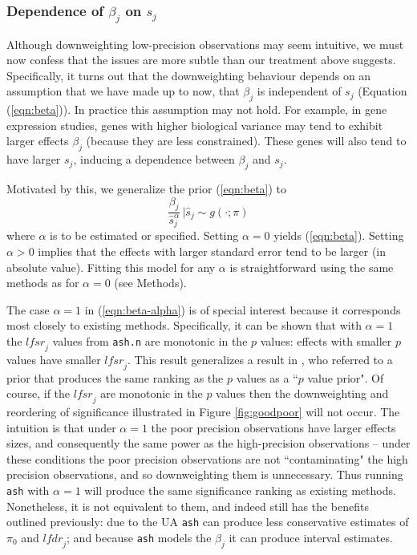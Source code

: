 \documentclass[11pt]{article}
\def\lfdr{\textit{lfdr}}
\def\lfsr{\textit{lfsr}}
\def\shat{\hat{s}}
\def\ash{{\tt ash}\xspace}
\begin{document}
 \subsubsection*{Dependence of $\beta_j$ on $s_j$}

 Although downweighting low-precision observations may seem intuitive, we must now
 confess that the issues are more subtle than our treatment above suggests. 
 Specifically, it turns out that the downweighting behaviour depends on an assumption 
that we have made up to now, that $\beta_j$ is independent
of $s_j$ (Equation (\ref{eqn:beta})). In practice this assumption may not hold. 
For example, in gene expression studies, 
genes with higher biological variance may tend to exhibit larger effects $\beta_j$ (because they are
less constrained). These genes will also tend to have larger $s_j$, 
inducing a dependence between $\beta_j$ and $s_j$.

Motivated by this, we generalize the prior (\ref{eqn:beta}) to
 \begin{equation} \label{eqn:beta-alpha}
 \frac{\beta_j}{\shat_j^\alpha} \, \big |  \shat_j \sim g(\cdot; \pi)
 \end{equation}
where $\alpha$ is to be estimated or specified. 
Setting $\alpha=0$ yields (\ref{eqn:beta}). Setting $\alpha>0$ implies that 
the effects with larger standard error tend to be larger (in absolute value).
Fitting this model for any $\alpha$ is straightforward using the same methods as for $\alpha=0$ (see Methods).

The case $\alpha=1$ in (\ref{eqn:beta-alpha}) is of special interest because it corresponds most closely
to existing methods. Specifically, it can be shown that with $\alpha=1$ the $\lfsr_j$ values from {\tt ash.n}
are monotonic in the $p$ values: effects with smaller $p$ values have smaller $\lfsr_j$. 
This result generalizes a result in \cite{wakefield:2009}, 
who referred to a prior that produces the same
ranking as the $p$ values as a ``$p$ value prior".
Of course, if the $\lfsr_j$ are monotonic in the $p$ values then the downweighting and
reordering of significance illustrated in Figure \ref{fig:goodpoor} will not occur.
The intuition is that under $\alpha=1$ the poor precision observations have larger effects sizes,
and consequently the same power 
as the high-precision observations -- under these conditions the poor precision observations are not ``contaminating" the high precision observations, and so downweighting them is unnecessary.
Thus running \ash with $\alpha=1$ will produce the same significance ranking as existing methods.
Nonetheless, it is not equivalent to them, and indeed still has the benefits outlined previously: due to the UA \ash can produce less conservative estimates of $\pi_0$ and $\lfdr_j$; and because \ash models the $\beta_j$ it can produce interval estimates. 
\end{document}
